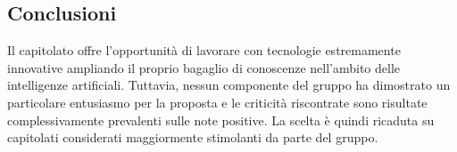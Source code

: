 \subsection{Conclusioni}
Il capitolato offre l'opportunità di lavorare con tecnologie estremamente innovative ampliando il proprio bagaglio di conoscenze nell'ambito delle intelligenze artificiali. Tuttavia, nessun componente del gruppo ha dimostrato un particolare entusiasmo per la proposta e le criticità riscontrate sono risultate complessivamente prevalenti sulle note positive. La scelta è quindi ricaduta su capitolati considerati maggiormente stimolanti da parte del gruppo.